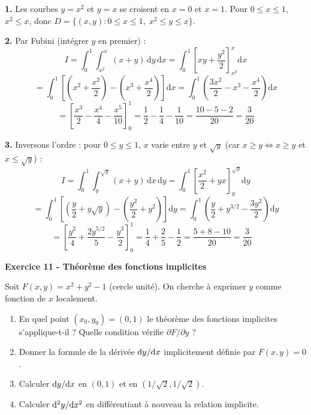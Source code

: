 \documentclass[12pt,a4paper]{article}
\begin{document}
\begin{boitecorrige}
\textbf{1.} Les courbes $y=x^2$ et $y=x$ se croisent en $x=0$ et $x=1$. Pour $0\leq x\leq1$, $x^2\leq x$, donc $D = \{(x,y) : 0\leq x\leq1,\; x^2\leq y\leq x\}$.

\textbf{2.} Par Fubini (intégrer $y$ en premier) :
\[
I = \int_0^1\!\int_{x^2}^x(x+y)\,\mathrm{d}y\,\mathrm{d}x = \int_0^1\!\left[xy + \frac{y^2}{2}\right]_{x^2}^x\mathrm{d}x
\]
\[
= \int_0^1\!\left[\left(x^2+\frac{x^2}{2}\right) - \left(x^3+\frac{x^4}{2}\right)\right]\mathrm{d}x = \int_0^1\!\left(\frac{3x^2}{2} - x^3 - \frac{x^4}{2}\right)\mathrm{d}x
\]
\[
= \left[\frac{x^3}{2} - \frac{x^4}{4} - \frac{x^5}{10}\right]_0^1 = \frac{1}{2} - \frac{1}{4} - \frac{1}{10} = \frac{10-5-2}{20} = \frac{3}{20}
\]

\textbf{3.} Inversons l'ordre : pour $0\leq y\leq1$, $x$ varie entre $y$ et $\sqrt{y}$ (car $x\geq y\Leftrightarrow x\geq y$ et $x\leq\sqrt{y}$) :
\[
I = \int_0^1\!\int_y^{\sqrt{y}}(x+y)\,\mathrm{d}x\,\mathrm{d}y = \int_0^1\!\left[\frac{x^2}{2}+yx\right]_y^{\sqrt{y}}\mathrm{d}y
\]
\[
= \int_0^1\!\left[\left(\frac{y}{2}+y\sqrt{y}\right)-\left(\frac{y^2}{2}+y^2\right)\right]\mathrm{d}y = \int_0^1\!\left(\frac{y}{2}+y^{3/2}-\frac{3y^2}{2}\right)\mathrm{d}y
\]
\[
= \left[\frac{y^2}{4}+\frac{2y^{5/2}}{5}-\frac{y^3}{2}\right]_0^1 = \frac{1}{4}+\frac{2}{5}-\frac{1}{2} = \frac{5+8-10}{20} = \frac{3}{20} \quad
\]
\end{boitecorrige}

\begin{boiteexercice}
\textbf{Exercice 11 - Théorème des fonctions implicites}\niveau{\difficile}

Soit $F(x,y) = x^2 + y^2 - 1$ (cercle unité). On cherche à exprimer $y$ comme fonction de $x$ localement.
\begin{enumerate}
  \item En quel point $(x_0, y_0) = (0,1)$ le théorème des fonctions implicites s'applique-t-il ? Quelle condition vérifie $\partial F/\partial y$ ?
  \item Donner la formule de la dérivée $\mathrm{d} y/\mathrm{d} x$ implicitement définie par $F(x,y)=0$.
  \item Calculer $\mathrm{d} y/\mathrm{d} x$ en $(0,1)$ et en $(1/\sqrt{2}, 1/\sqrt{2})$.
  \item Calculer $\mathrm{d}^2y/\mathrm{d} x^2$ en différentiant à nouveau la relation implicite.
\end{enumerate}
\end{boiteexercice}
\end{document}
